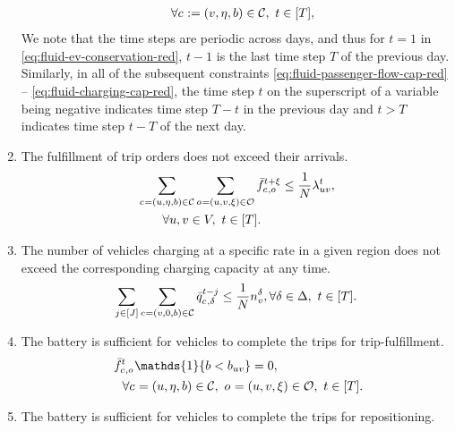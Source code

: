 \begin{enumerate}
\begin{align}
        &\qquad \forall \cartype{}:= (\destination, \timetoarrival, \battery) \in \Cartype, \   \time \in [\Horizon], \label{eq:fluid-ev-conservation-red}
    \end{align}
    We note that the time steps are periodic across days, and thus for $t=1$ in \eqref{eq:fluid-ev-conservation-red}, $t-1$ is the last time step $T$ of the previous day. Similarly, in all of the subsequent constraints \eqref{eq:fluid-passenger-flow-cap-red} -- \eqref{eq:fluid-charging-cap-red}, the time step $t$ on the superscript of a variable being negative indicates time step $T-t$ in the previous day and $t>T$ indicates time step $t-T$ of the next day. 
    \item The fulfillment of trip orders does not exceed their arrivals.
    \begin{align}
        &\sum_{\cartype{}=(\origin, \timetoarrival, \battery) \in \Cartype}^{}\sum_{\triptype{}=(\origin, \destination, \tripactivetime) \in \Triptype}^{} \lptripfulfill{\cartype{}, \triptype{}}{\time + \tripactivetime} \leq \frac{1}{\Size} \arrrate{\origin \destination}{\time}, \notag\\ 
        &\qquad \forall \origin, \destination \in \Region,\ \time \in [\Horizon].\label{eq:fluid-passenger-flow-cap-red}
    \end{align}
    \item The number of vehicles charging at a specific rate in a given region does not exceed the corresponding charging capacity at any time.
    \begin{align}
        \sum_{j \in [\chargetime]} \sum_{\cartype{}= (\region, 0, \battery) \in \Cartype} \lpcharge{\cartype{}, \type}{\time - j} \leq \frac{1}{\Size}\n{\region}{\type}, \forall \type \in \Type, \  \time \in [\Horizon]. \label{eq:fluid-charging-cap-red}
    \end{align}
    \item The battery is sufficient for vehicles to complete the trips for trip-fulfillment.
    \begin{align}
        &\ \lptripfulfill{\cartype{}, \triptype{}}{\time} \mathds{1}\{\battery < \batterycost{\origin \destination}\} = 0,\notag\\ 
        &\quad \forall \cartype{}= (\origin, \timetoarrival, \battery) \in \Cartype,\ \triptype{}= (\origin, \destination, \tripactivetime) \in \Triptype, \ \time \in [\Horizon]. \label{eq:fluid-passenger-flow-battery-sufficiency-red}
    \end{align}
    \item The battery is sufficient for vehicles to complete the trips for repositioning.

\end{enumerate}
